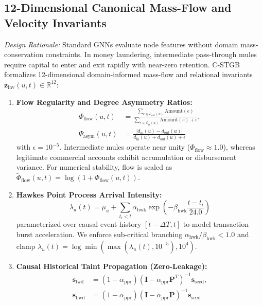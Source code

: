\subsection{12-Dimensional Canonical Mass-Flow and Velocity Invariants}
\label{sec:canonical_invariants}
\textit{Design Rationale:} Standard GNNs evaluate node features without domain mass-conservation constraints. In money laundering, intermediate pass-through mules require capital to enter and exit rapidly with near-zero retention. C-STGB formalizes 12-dimensional domain-informed mass-flow and relational invariants $\mathbf{z}_{\text{inv}}(u, t) \in \mathbb{R}^{12}$:
\begin{enumerate}[leftmargin=*]
    \item \textbf{Flow Regularity and Degree Asymmetry Ratios:}
    \begin{align}
    \Phi_{\text{flow}}(u, t) &= \frac{\sum_{e \in \mathcal{E}_{\text{out}}(u)} \text{Amount}(e)}{\sum_{e \in \mathcal{E}_{\text{in}}(u)} \text{Amount}(e) + \epsilon}, \\
    \Psi_{\text{asym}}(u, t) &= \frac{|d_{\text{in}}(u) - d_{\text{out}}(u)|}{d_{\text{in}}(u) + d_{\text{out}}(u) + \epsilon}
    \end{align}
    with $\epsilon = 10^{-5}$. Intermediate mules operate near unity ($\Phi_{\text{flow}} \approx 1.0$), whereas legitimate commercial accounts exhibit accumulation or disbursement variance. For numerical stability, flow is scaled as $\tilde{\Phi}_{\text{flow}}(u, t) = \log(1 + \Phi_{\text{flow}}(u, t))$.
    \item \textbf{Hawkes Point Process Arrival Intensity:}
    \begin{equation}
    \lambda_u(t) = \mu_u + \sum_{t_i < t} \alpha_{\text{hwk}} \exp\left(-\beta_{\text{hwk}} \frac{t - t_i}{24.0}\right)
    \end{equation}
    parameterized over causal event history $[t - \Delta T, t]$ to model transaction burst acceleration. We enforce sub-critical branching $\alpha_{\text{hwk}} / \beta_{\text{hwk}} < 1.0$ and clamp $\tilde{\lambda}_u(t) = \log \min(\max(\lambda_u(t), 10^{-5}), 10^4)$.
    \item \textbf{Causal Historical Taint Propagation (Zero-Leakage):}
    \begin{align}
    \mathbf{s}_{\text{fwd}} &= (1 - \alpha_{\text{ppr}}) (\mathbf{I} - \alpha_{\text{ppr}} \mathbf{P}^T)^{-1} \mathbf{s}_{\text{seed}}, \\
    \mathbf{s}_{\text{bwd}} &= (1 - \alpha_{\text{ppr}}) (\mathbf{I} - \alpha_{\text{ppr}} \mathbf{P})^{-1} \mathbf{s}_{\text{seed}}

\end{align}
\end{enumerate}
